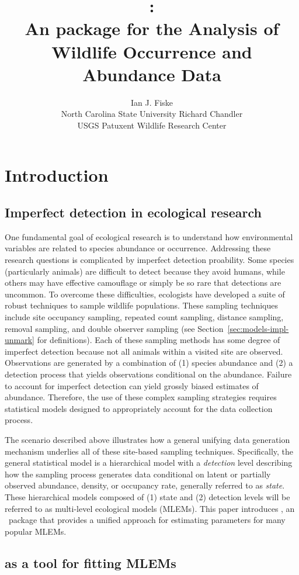\documentclass[article,shortnames]{jss}
\author{Ian J. Fiske\\North Carolina State University \And
  Richard Chandler\\ USGS Patuxent Wildlife Research Center}
\title{\pkg{unmarked}:\\
  An \proglang{R} package for the Analysis of Wildlife Occurrence and Abundance Data}
\newcommand{\um}{\pkg{unmarked}}
\newcommand{\rlang}{\proglang{R}}
\begin{document}
\section{Introduction}


\subsection{Imperfect detection in ecological research}

One fundamental goal of ecological research is to understand how environmental variables are related to species abundance or occurrence.  Addressing these research questions is complicated by imperfect detection proability.  Some species (particularly animals) are difficult to detect because they avoid humans, while others may have effective camouflage or simply be so rare that detections are uncommon.  To overcome these difficulties, ecologists have developed a suite of robust techniques to sample wildlife populations.  These sampling techniques include site occupancy sampling, repeated count sampling, distance sampling, removal sampling, and double observer sampling (see Section~\ref{sec:models-impl-unmark} for definitions).  Each of these sampling methods has some degree of imperfect detection because not all animals within a visited site are observed.  Observations are generated by a combination of (1) species abundance and (2) a detection process that yields observations conditional on the abundance.  Failure to account for imperfect detection can yield grossly biased estimates of abundance.  Therefore, the use of these complex sampling strategies requires statistical models designed to appropriately account for the data collection process.

The scenario described above illustrates how a general unifying data generation mechanism underlies all of these site-based sampling techniques.  Specifically, the general statistical model is a hierarchical model with a \emph{detection} level describing how the sampling process generates data conditional on latent or partially observed abundance, density, or occupancy rate, generally referred to as \emph{state}.  These hierarchical models composed of (1) state and (2) detection levels will be referred to as multi-level ecological models (MLEMs).  This paper introduces \um, an \rlang\ package that provides a unified approach for estimating parameters for many popular MLEMs.

\subsection[unmarked as a tool for fitting MLEMs]{ as a tool for fitting MLEMs} 
\end{document}
